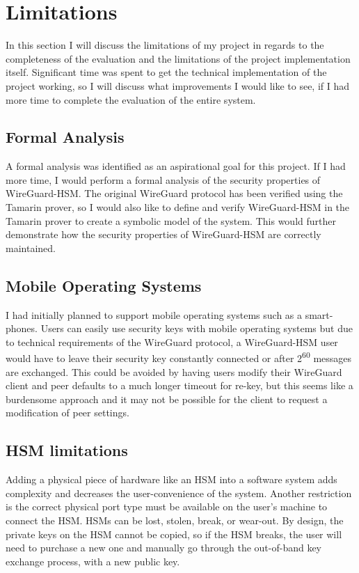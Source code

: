 \documentclass [11pt, proquest] {uwthesis}[2020/02/24]
\begin{document}
\section {Limitations}
In this section I will discuss the limitations of my project in regards to the completeness of the evaluation and the limitations of the project implementation itself. Significant time was spent to get the technical implementation of the project working, so I will discuss what improvements I would like to see, if I had more time to complete the evaluation of the entire system.

\subsection{Formal Analysis}
A formal analysis was identified as an aspirational goal for this project. If I had more time, I would perform a formal analysis of the security properties of WireGuard-HSM. The original WireGuard protocol has been verified using the Tamarin prover\cite{donenfeld_formal_2018}, so I would also like to define and verify WireGuard-HSM in the Tamarin prover to create a symbolic model of the system. This would further demonstrate how the security properties of WireGuard-HSM are correctly maintained.

\subsection{Mobile Operating Systems}
I had initially planned to support mobile operating systems such as a smart-phones. Users can easily use security keys with mobile operating systems but due to technical requirements of the WireGuard protocol, a WireGuard-HSM user would have to leave their security key constantly connected
or after 2\textsuperscript{60} messages are exchanged. This could be avoided by having users modify their WireGuard client and peer defaults to a much longer timeout for re-key, but this seems like a burdensome approach and it may not be possible for the client to request a modification of peer settings.

\subsection{HSM limitations}
Adding a physical piece of hardware like an HSM into a software system adds complexity and decreases the user-convenience of the system. Another restriction is the correct physical port type must be available on the user's machine to connect the HSM. HSMs can be lost, stolen, break, or wear-out. By design, the private keys on the HSM cannot be copied, so if the HSM breaks, the user will need to purchase a new one and manually go through the out-of-band key exchange process, with a new public key.
\end{document}
